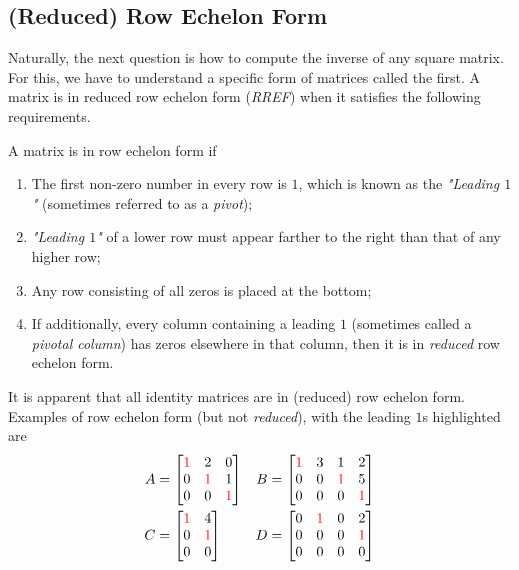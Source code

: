 \subsection{(Reduced) Row Echelon Form}
\label{section:echelon}
Naturally, the next question is how to compute the inverse of any square matrix. For this, we have to understand a specific form of matrices called the  first. A matrix is in reduced row echelon form (\textit{RREF}) when it satisfies the following requirements.
\begin{defn}
\label{defn:rref}
A matrix is in row echelon form if
\begin{enumerate}
\item The first non-zero number in every row is $1$, which is known as the \textit{"Leading $1$"} (sometimes referred to as a \textit{pivot});
\item \textit{"Leading $1$"} of a lower row must appear farther to the right than that of any higher row;
\item Any row consisting of all zeros is placed at the bottom;
\item If additionally, every column containing a leading $1$ (sometimes called a \textit{pivotal column}) has zeros elsewhere in that column, then it is in \textit{reduced} row echelon form.
\end{enumerate}
\end{defn}
It is apparent that all identity matrices are in (reduced) row echelon form. Examples of row echelon form (but not \textit{reduced}), with the leading $1$s highlighted are
\begin{align*}
A &=
\begin{bmatrix}
\textcolor{red}{1} & 2 & 0 \\
0 & \textcolor{red}{1} & 1 \\
0 & 0 & \textcolor{red}{1}
\end{bmatrix}
& B &=
\begin{bmatrix}
\textcolor{red}{1} & 3 & 1 & 2 \\
0 & 0 & \textcolor{red}{1} & 5 \\
0 & 0 & 0 & \textcolor{red}{1}
\end{bmatrix} \\
C &=
\begin{bmatrix}
\textcolor{red}{1} & 4 \\
0 & \textcolor{red}{1} \\
0 & 0 
\end{bmatrix}
& D &=
\begin{bmatrix}
0 & \textcolor{red}{1} & 0 & 2 \\
0 & 0 & 0 & \textcolor{red}{1} \\
0 & 0 & 0 & 0
\end{bmatrix}
\end{align*}
